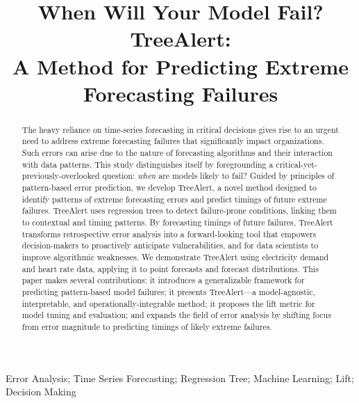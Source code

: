 \documentclass[]{interact}
\theoremstyle{plain}
\theoremstyle{definition}
\theoremstyle{remark}
\begin{document}

\title{When Will Your Model Fail? TreeAlert: \\ A Method for Predicting Extreme Forecasting Failures}

\author{
}

\maketitle

\begin{abstract}
The heavy reliance on time-series forecasting in critical decisions gives rise to an urgent need to address extreme forecasting failures that significantly impact organizations. Such errors can arise due to the nature of forecasting algorithms and their interaction with data patterns. This study distinguishes itself by foregrounding a critical-yet-previously-overlooked question: \emph{when} are models likely to fail? Guided by principles of pattern-based error prediction, we develop TreeAlert, a novel method designed to identify patterns of extreme forecasting errors and predict timings of future extreme failures. TreeAlert uses regression trees to detect failure-prone conditions, linking them to contextual and timing patterns. By forecasting timings of future failures, TreeAlert transforms retrospective error analysis into a forward-looking tool that empowers decision-makers to proactively anticipate vulnerabilities, and for data scientists to improve algorithmic weaknesses. We demonstrate TreeAlert using electricity demand and heart rate data, applying it to point forecasts and forecast distributions. This paper makes several contributions: it introduces a generalizable framework for predicting pattern-based model failures; it presents TreeAlert---a model-agnostic, interpretable, and operationally-integrable method; it proposes the lift metric for model tuning and evaluation; and expands the field of error analysis by shifting focus from error magnitude to predicting timings of likely extreme failures.
\end{abstract}

\begin{keywords}
Error Analysis; Time Series Forecasting; Regression Tree; Machine Learning; Lift; Decision Making
\end{keywords}
\end{document}
